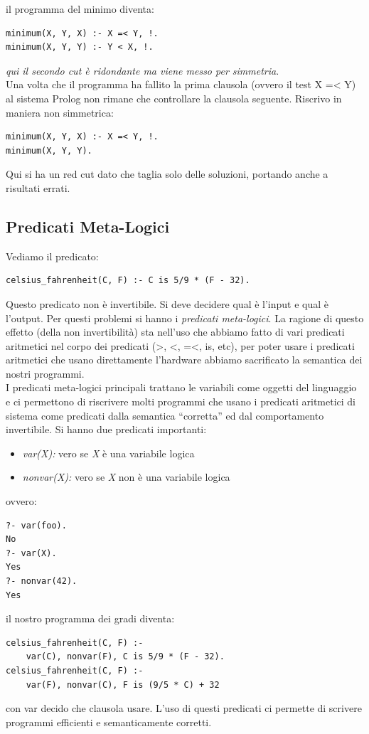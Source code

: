\documentclass[a4paper]{report}
\begin{document}
\begin{itemize}
\begin{center}
\end{center}
il programma del minimo diventa:
\begin{verbatim}
minimum(X, Y, X) :- X =< Y, !.
minimum(X, Y, Y) :- Y < X, !.
\end{verbatim}
\textit{qui il secondo cut è ridondante ma viene messo per simmetria}.\\
Una volta che il programma ha fallito la prima clausola (ovvero il
test X =< Y) al sistema Prolog non rimane che controllare la
clausola seguente. Riscrivo in maniera non simmetrica:
\begin{verbatim}
minimum(X, Y, X) :- X =< Y, !.
minimum(X, Y, Y).
\end{verbatim}
Qui si ha un red cut dato che taglia solo delle soluzioni, portando anche a risultati errati.\\
\subsection{Predicati Meta-Logici}
Vediamo il predicato:
\begin{verbatim}
celsius_fahrenheit(C, F) :- C is 5/9 * (F - 32).
\end{verbatim}
Questo predicato non è invertibile. Si deve decidere qual è l'input e qual è l'output. Per questi problemi si hanno i \textit{predicati meta-logici}. La ragione di questo effetto (della non invertibilità) sta nell'uso che abbiamo fatto di vari predicati aritmetici nel corpo dei predicati (>, <, =<, is, etc), per poter usare i predicati aritmetici che usano direttamente l'hardware abbiamo sacrificato la semantica dei
nostri programmi.\\
I predicati meta-logici principali trattano le variabili come oggetti del linguaggio e ci permettono di riscrivere molti programmi che usano i predicati aritmetici di sistema come predicati dalla semantica “corretta” ed dal comportamento invertibile. Si hanno due predicati importanti:
\begin{itemize}
\item \textit{var(X):}  vero se \textit{X} è una variabile logica
\item \textit{nonvar(X):}  vero se \textit{X} non è una variabile logica
\end{itemize}
ovvero:
\begin{verbatim}
?- var(foo).
No
?- var(X).
Yes
?- nonvar(42).
Yes
\end{verbatim}
il nostro programma dei gradi diventa:
\begin{verbatim}
celsius_fahrenheit(C, F) :- 
	var(C), nonvar(F), C is 5/9 * (F - 32).
celsius_fahrenheit(C, F) :- 
	var(F), nonvar(C), F is (9/5 * C) + 32
\end{verbatim}
con var decido che clausola usare. L'uso di questi predicati ci permette di scrivere programmi efficienti e semanticamente corretti.

\end{itemize}
\end{document}
